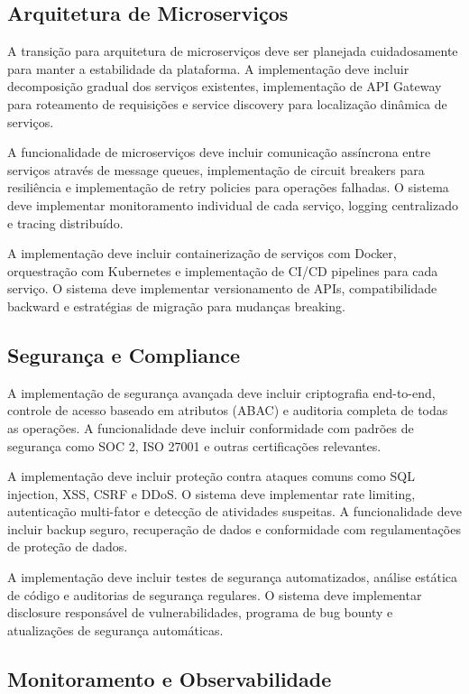 \documentclass[12pt,a4paper]{article}
\begin{document}
\subsection{Arquitetura de Microserviços}

A transição para arquitetura de microserviços deve ser planejada cuidadosamente para manter a estabilidade da plataforma. A implementação deve incluir decomposição gradual dos serviços existentes, implementação de API Gateway para roteamento de requisições e service discovery para localização dinâmica de serviços.

A funcionalidade de microserviços deve incluir comunicação assíncrona entre serviços através de message queues, implementação de circuit breakers para resiliência e implementação de retry policies para operações falhadas. O sistema deve implementar monitoramento individual de cada serviço, logging centralizado e tracing distribuído.

A implementação deve incluir containerização de serviços com Docker, orquestração com Kubernetes e implementação de CI/CD pipelines para cada serviço. O sistema deve implementar versionamento de APIs, compatibilidade backward e estratégias de migração para mudanças breaking.

\subsection{Segurança e Compliance}

A implementação de segurança avançada deve incluir criptografia end-to-end, controle de acesso baseado em atributos (ABAC) e auditoria completa de todas as operações. A funcionalidade deve incluir conformidade com padrões de segurança como SOC 2, ISO 27001 e outras certificações relevantes.

A implementação deve incluir proteção contra ataques comuns como SQL injection, XSS, CSRF e DDoS. O sistema deve implementar rate limiting, autenticação multi-fator e detecção de atividades suspeitas. A funcionalidade deve incluir backup seguro, recuperação de dados e conformidade com regulamentações de proteção de dados.

A implementação deve incluir testes de segurança automatizados, análise estática de código e auditorias de segurança regulares. O sistema deve implementar disclosure responsável de vulnerabilidades, programa de bug bounty e atualizações de segurança automáticas.

\subsection{Monitoramento e Observabilidade}
\end{document}
